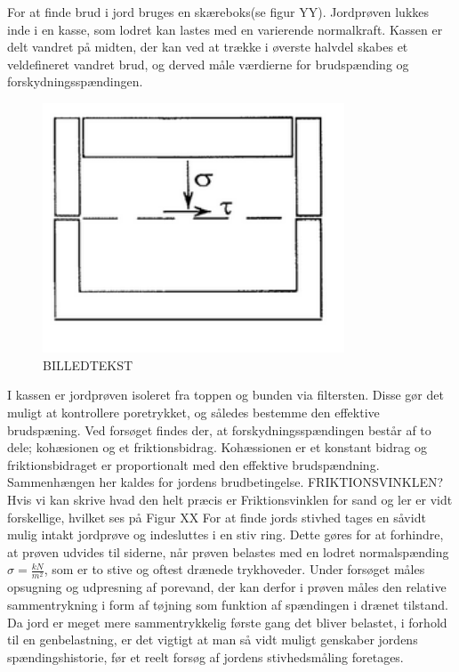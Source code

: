 For at finde brud i jord bruges en skæreboks(se figur YY). Jordprøven lukkes inde i en kasse, som lodret kan lastes med en varierende normalkraft. Kassen er delt vandret på midten, der kan ved at trække i øverste halvdel skabes et veldefineret vandret brud, og derved måle værdierne for brudspænding og forskydningsspændingen.

\begin{figure}[htbp] \centering
	\begin{minipage}[b]{0.48\textwidth}\centering
		\includegraphics[width=0.8\textwidth]{billeder/forskud.png}
		\caption{BILLEDTEKST}
		\label{fig:forskudningsspanding}
	\end{minipage}\hfill
\end{figure}

\indent{     }  I kassen er jordprøven isoleret fra toppen og bunden via filtersten. Disse gør det muligt at kontrollere poretrykket, og således bestemme den effektive brudspæning. Ved forsøget findes der, at forskydningsspændingen består af to dele; kohæsionen og et friktionsbidrag. Kohæssionen er et konstant bidrag og friktionsbidraget er proportionalt med den effektive brudspændning. Sammenhængen her kaldes for jordens brudbetingelse.
\newline
\newline
FRIKTIONSVINKLEN? Hvis vi kan skrive hvad den helt præcis er
\newline
Friktionsvinklen for sand og ler er vidt forskellige, hvilket ses på Figur XX
\newline
\newline
For at finde jords stivhed tages en såvidt mulig intakt jordprøve og indesluttes i en stiv ring. Dette gøres for at forhindre, at prøven udvides til siderne, når prøven belastes med en lodret normalspænding $\sigma=\frac{kN}{m^2}$, som er to stive og oftest drænede trykhoveder. Under forsøget måles opsugning og udpresning af porevand, der kan derfor i prøven måles den relative sammentrykning i form af tøjning som funktion af spændingen i drænet tilstand. Da jord er meget mere sammentrykkelig første gang det bliver belastet, i forhold til en genbelastning, er det vigtigt at man så vidt muligt genskaber jordens spændingshistorie, før et reelt forsøg af jordens stivhedsmåling foretages. 


